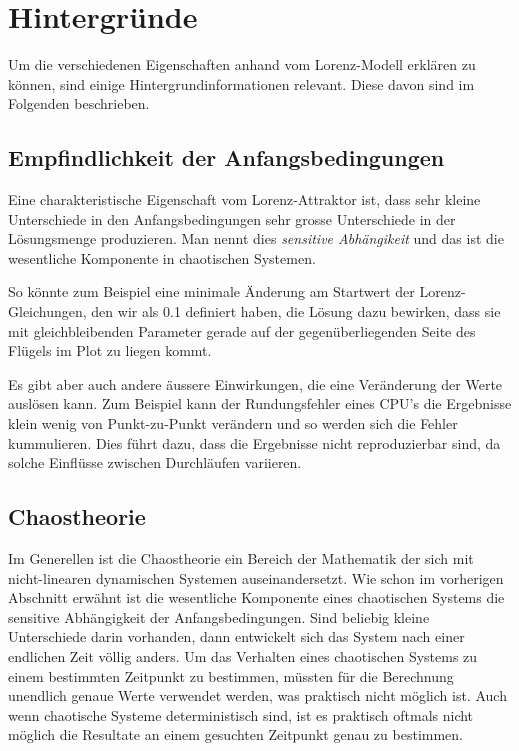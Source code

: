 
\section{Hintergründe}
Um die verschiedenen Eigenschaften anhand vom Lorenz-Modell erklären zu können, sind einige Hintergrundinformationen relevant. Diese davon sind im Folgenden beschrieben.

\subsection{Empfindlichkeit der Anfangsbedingungen}
Eine charakteristische Eigenschaft vom Lorenz-Attraktor ist, dass sehr kleine Unterschiede in den Anfangsbedingungen sehr grosse Unterschiede in der Lösungsmenge produzieren. Man nennt dies \textit{sensitive Abhängikeit} und das ist die wesentliche Komponente in chaotischen Systemen. 

So könnte zum Beispiel eine minimale Änderung am Startwert der Lorenz-Gleichungen, den wir als 0.1 definiert haben, die Lösung dazu bewirken, dass sie mit gleichbleibenden Parameter gerade auf der gegenüberliegenden Seite des Flügels im Plot zu liegen kommt. 

Es gibt aber auch andere äussere Einwirkungen, die eine Veränderung der Werte auslösen kann. Zum Beispiel kann der Rundungsfehler eines CPU's die Ergebnisse klein wenig von Punkt-zu-Punkt verändern und so werden sich die Fehler kummulieren. Dies führt dazu, dass die Ergebnisse nicht reproduzierbar sind, da solche Einflüsse zwischen Durchläufen variieren.

\subsection{Chaostheorie}
Im Generellen ist die Chaostheorie ein Bereich der Mathematik der sich mit nicht-linearen dynamischen Systemen auseinandersetzt. Wie schon im vorherigen Abschnitt erwähnt ist die wesentliche Komponente eines chaotischen Systems die sensitive Abhängigkeit der Anfangsbedingungen. Sind beliebig kleine Unterschiede darin vorhanden, dann entwickelt sich das System nach einer endlichen Zeit völlig anders. Um das Verhalten eines chaotischen Systems zu einem bestimmten Zeitpunkt zu bestimmen, müssten für die Berechnung unendlich genaue Werte verwendet werden, was praktisch nicht möglich ist. Auch wenn chaotische Systeme deterministisch sind, ist es praktisch oftmals nicht möglich die Resultate an einem gesuchten Zeitpunkt genau zu bestimmen. 


